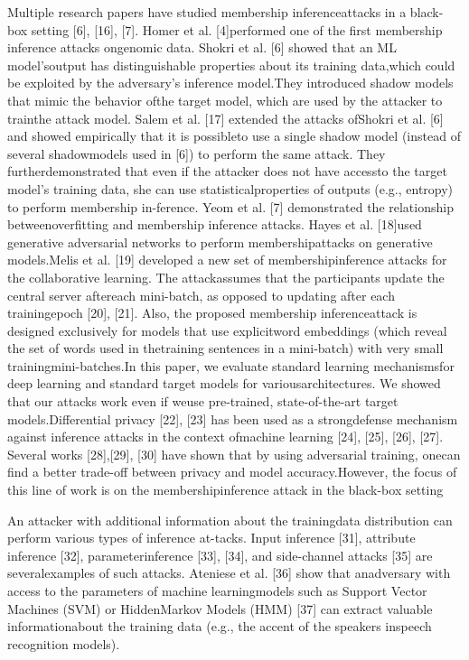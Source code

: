 Multiple research papers have studied membership inferenceattacks  in  a  black-box  setting  [6],  [16],  [7].  Homer  et  al.  [4]performed  one  of  the  first  membership  inference  attacks  ongenomic  data.  Shokri  et  al.  [6]  showed  that  an  ML  model’soutput  has  distinguishable  properties  about  its  training  data,which could be exploited by the adversary’s inference model.They  introduced  shadow  models  that  mimic  the  behavior  ofthe  target  model,  which  are  used  by  the  attacker  to  trainthe  attack  model.  Salem  et  al.  [17]  extended  the  attacks  ofShokri  et  al.  [6]  and  showed  empirically  that  it  is  possibleto  use  a  single  shadow  model  (instead  of  several  shadowmodels used in   [6]) to perform the same attack. They furtherdemonstrated  that  even  if  the  attacker  does  not  have  accessto  the  target  model’s  training  data,  she  can  use  statisticalproperties of outputs (e.g., entropy) to perform membership in-ference. Yeom et al. [7] demonstrated the relationship betweenoverfitting and membership inference attacks. Hayes et al. [18]used  generative  adversarial  networks  to  perform  membershipattacks on generative models.Melis  et  al.  [19]  developed  a  new  set  of  membershipinference  attacks  for  the  collaborative  learning.  The  attackassumes  that  the  participants  update  the  central  server  aftereach  mini-batch,  as  opposed  to  updating  after  each  trainingepoch  [20],  [21].  Also,  the  proposed  membership  inferenceattack  is  designed  exclusively  for  models  that  use  explicitword embeddings (which reveal the set of words used in thetraining  sentences  in  a  mini-batch)  with  very  small  trainingmini-batches.In  this  paper,  we  evaluate  standard  learning  mechanismsfor  deep  learning  and  standard  target  models  for  variousarchitectures.  We  showed  that  our  attacks  work  even  if  weuse pre-trained, state-of-the-art target models.Differential  privacy  [22],  [23]  has  been  used  as  a  strongdefense mechanism against inference attacks in the context ofmachine  learning  [24],  [25],  [26],  [27].  Several  works  [28],[29], [30] have shown that by using adversarial training, onecan find a better trade-off between privacy and model accuracy.However, the focus of this line of work is on the membershipinference attack in the black-box setting

An  attacker  with  additional  information  about  the  trainingdata  distribution  can  perform  various  types  of  inference  at-tacks. Input inference [31], attribute inference [32], parameterinference [33], [34], and side-channel attacks [35] are severalexamples  of  such  attacks.  Ateniese  et  al.  [36]  show  that  anadversary  with  access  to  the  parameters  of  machine  learningmodels  such  as  Support  Vector  Machines  (SVM)  or  HiddenMarkov Models (HMM) [37] can extract valuable informationabout  the  training  data  (e.g.,  the  accent  of  the  speakers  inspeech recognition models).
